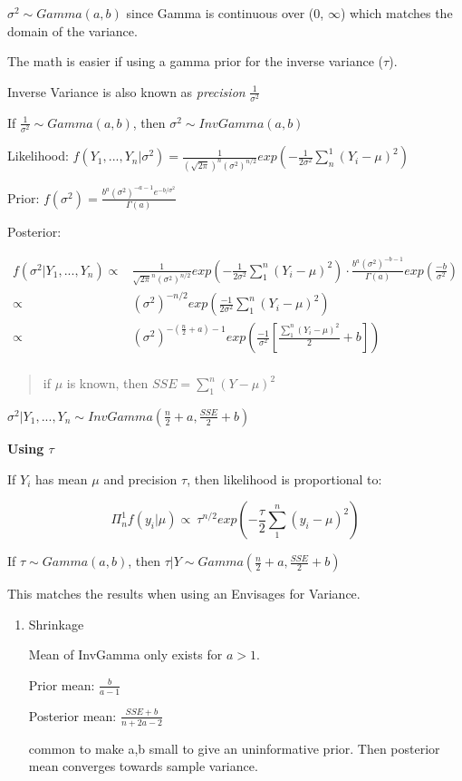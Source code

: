 \documentclass[11pt]{article}
\begin{document}
\(\sigma^2 \sim Gamma(a, b)\) since Gamma is continuous over (0, \(\infty\)) which
matches the domain of the variance.

The math is easier if using a gamma prior for the inverse variance (\(\tau\)).

Inverse Variance is also known as \emph{precision} \(\frac{1}{\sigma^2}\)

If \(\frac{1}{\sigma^2} \sim Gamma(a, b)\), then \(\sigma^2 \sim InvGamma(a, b)\)

Likelihood: \(f(Y_1, ..., Y_n | \sigma^2) = \frac{1}{(\sqrt{2 \pi})^n
(\sigma^2)^{n/2}} exp(- \frac{1}{2 \sigma^2} \sum^{1}_{n} (Y_i - \mu)^2)\)

Prior: \(f(\sigma^2) = \frac{b^a (\sigma^2)^{-a - 1} e^{-b / \sigma^2}}{\Gamma (a)}\)

Posterior:

\begin{equation}
\begin{split}
f(\sigma^2 | Y_1, ..., Y_n) \propto & \frac{1}{\sqrt{2 \pi}^n (\sigma^2)^{n/2}} exp(- \frac{1}{2 \sigma^2} \sum_{1}^{n} (Y_i - \mu)^2) \cdot \frac{b^a (\sigma^2)^{-b - 1}}{\Gamma (a)} exp(\frac{-b}{\sigma^2})\\
\propto & (\sigma^2)^{-n / 2} exp(\frac{- 1}{2 \sigma^2} \sum_{1}^{n} (Y_i - \mu)^2)\\
\propto & (\sigma^2)^{- (\frac{n}{2} + a) - 1} exp(\frac{- 1}{\sigma^2} [\frac{\sum_{1}^{n} (Y_i - \mu)^2}{2} + b])\\
\end{split}
\end{equation}


\begin{quote}
if \(\mu\) is known, then \(SSE = \sum_{1}^{n} (Y - \mu)^2\)
\end{quote}

\(\sigma^2 | Y_1, ..., Y_n \sim InvGamma(\frac{n}{2} + a, \frac{SSE}{2} + b)\)


\textbf{Using \(\tau\)}

If \(Y_i\) has mean \(\mu\) and precision \(\tau\), then likelihood is proportional
to:

$$
\Pi^{1}_{n} f(y_i | \mu) \propto \ \tau^{n / 2} exp(- \frac{\tau}{2}
\sum_{1}^{n} (y_i - \mu)^2)
$$

If \(\tau \sim Gamma(a,b)\), then \(\tau | Y \sim Gamma(\frac{n}{2} + a,
\frac{SSE}{2} + b)\)

This matches the results when using an Envisages for Variance.
\begin{enumerate}
\item Shrinkage
\label{sec:orga61878c}

Mean of InvGamma only exists for \(a > 1\).

Prior mean: \(\frac{b}{a - 1}\)

Posterior mean: \(\frac{SSE + b}{n + 2a - 2}\)

common to make a,b small to give an uninformative prior. Then posterior mean
converges towards sample variance.
\end{enumerate}
\end{document}
